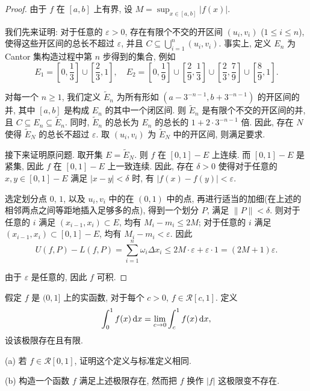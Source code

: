 ﻿\documentclass{article}
\begin{document}
\begin{proof}
  由于 \( f \) 在 \( [a,b] \) 上有界, 设 \( M=\sup_{x\in[a,b]}|f(x)| \).

  我们先来证明: 对于任意的 \( \varepsilon>0 \), 存在有限个不交的开区间 \( (u_i,v_i) \) (\( 1\le i\le n \)), 使得这些开区间的总长不超过 \( \varepsilon \), 并且 \( C \subseteq \bigcup_{i=1}^n (u_i,v_i) \). 事实上, 定义 \( E_n \) 为 Cantor 集构造过程中第 \( n \) 步得到的集合, 例如 
  \[ E_1=\left[ 0,\frac{1}{3} \right]\cup\left[ \frac{2}{3},1 \right],\quad
  E_2=\left[ 0,\frac{1}{9} \right]\cup\left[ \frac{2}{9},\frac{1}{3} \right]\cup\left[ \frac{2}{3},\frac{7}{9} \right]\cup\left[ \frac{8}{9},1 \right]. \]

  对每一个 \( n\ge 1 \), 我们定义 \( \tilde{E}_n \) 为所有形如 \( \left( a-3^{-n-1},b+3^{-n-1} \right) \) 的开区间的并, 其中 \( [a,b] \) 是构成 \( E_n \) 的其中一个闭区间. 则 \( \tilde{E}_n \) 是有限个不交的开区间的并, 且 \( C \subseteq E_n \subseteq \tilde{E}_n \). 同时, \( \tilde{E}_n \) 的总长为 \( E_n \) 的总长的 \( 1+2\cdot 3^{-n-1} \) 倍. 因此, 存在 \( N \) 使得 \( \tilde{E}_N \) 的总长不超过 \( \varepsilon \). 取 \( (u_i,v_i) \) 为 \( \tilde{E}_N \) 中的开区间, 则满足要求.

  接下来证明原问题. 取开集 \( E=\tilde{E}_N \). 则 \( f \) 在 \( [0,1]-E \) 上连续. 而 \( [0,1]-E \) 是紧集, 因此 \( f \) 在 \( [0,1]-E \) 上一致连续. 因此, 存在 \( \delta>0 \) 使得对于任意的 \( x,y\in[0,1]-E \) 满足 \( |x-y|<\delta \) 时, 有 \( |f(x)-f(y)|<\varepsilon \).

  选定划分点 \( 0 \), \( 1 \), 以及 \( u_i, v_i \) 中的在 \( (0,1) \) 中的点, 再进行适当的加细(在上述的相邻两点之间等距地插入足够多的点), 得到一个划分 \( P \), 满足 \( \|P\|<\delta \). 则对于任意的 \( i \) 满足 \( (x_{i-1},x_i)\subset E \), 均有 \( M_i-m_i \le 2M \); 对于任意的 \( i \) 满足 \( (x_{i-1},x_i)\subset [0,1]-E \), 均有 \( M_i-m_i<\varepsilon \). 因此
\[ U(f,P)-L(f,P) = \sum_{i=1}^n \omega_i \Delta x_i \le 2M\cdot \varepsilon + \varepsilon \cdot 1 = (2M+1)\varepsilon. \]

  由于 \( \varepsilon \) 是任意的, 因此 \( f \) 可积.
\end{proof}



\begin{problem}
假定 $f$ 是 $(0, 1]$ 上的实函数, 对于每个 $c > 0$, $f \in \mathscr{R}[c, 1]$. 定义
\[ \int_0^1 f(x) \,\mathrm{d} x = \lim_{c \to 0} \int_c^1 f(x) \,\mathrm{d} x, \]
设该极限存在且有限.

(a) 若 $f \in \mathscr{R}[0, 1]$, 证明这个定义与标准定义相同.

(b) 构造一个函数 $f$ 满足上述极限存在, 然而把 $f$ 换作 $|f|$ 这极限变不存在.
\end{problem}
\end{document}
